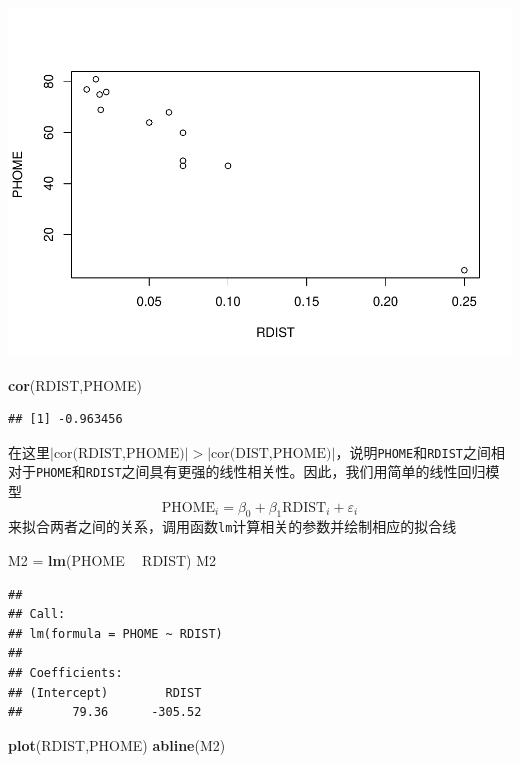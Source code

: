 \documentclass[]{article}
\newenvironment{Shaded}{\begin{snugshade}}{\end{snugshade}}
\newcommand{\KeywordTok}[1]{\textcolor[rgb]{0.13,0.29,0.53}{\textbf{#1}}}
\newcommand{\NormalTok}[1]{#1}
\newcommand{\OperatorTok}[1]{\textcolor[rgb]{0.81,0.36,0.00}{\textbf{#1}}}
\newcommand{\StringTok}[1]{\textcolor[rgb]{0.31,0.60,0.02}{#1}}
\begin{document}
\includegraphics{Homework_7_files/figure-latex/unnamed-chunk-6-1.pdf}

\begin{Shaded}
\begin{Highlighting}[]
\KeywordTok{cor}\NormalTok{(RDIST,PHOME)}
\end{Highlighting}
\end{Shaded}

\begin{verbatim}
## [1] -0.963456
\end{verbatim}

在这里\(|\text{cor(RDIST,PHOME)}|>|\text{cor(DIST,PHOME)}|\)，说明\texttt{PHOME}和\texttt{RDIST}之间相对于\texttt{PHOME}和\texttt{RDIST}之间具有更强的线性相关性。因此，我们用简单的线性回归模型
\[
\text{PHOME}_i=\beta_0+\beta_1\text{RDIST}_i+\varepsilon_i
\]
来拟合两者之间的关系，调用函数\texttt{lm}计算相关的参数并绘制相应的拟合线

\begin{Shaded}
\begin{Highlighting}[]
\NormalTok{M2 =}\StringTok{ }\KeywordTok{lm}\NormalTok{(PHOME }\OperatorTok{~}\StringTok{ }\NormalTok{RDIST)}
\NormalTok{M2}
\end{Highlighting}
\end{Shaded}

\begin{verbatim}
## 
## Call:
## lm(formula = PHOME ~ RDIST)
## 
## Coefficients:
## (Intercept)        RDIST  
##       79.36      -305.52
\end{verbatim}

\begin{Shaded}
\begin{Highlighting}[]
\KeywordTok{plot}\NormalTok{(RDIST,PHOME)}
\KeywordTok{abline}\NormalTok{(M2)}
\end{Highlighting}
\end{Shaded}
\end{document}
